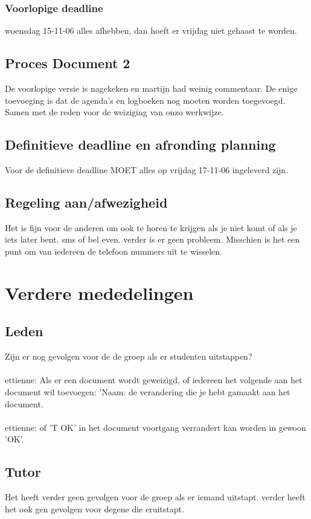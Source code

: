 \documentclass[11pt]{article}
\begin{document}
\subsubsection*{Voorlopige deadline}
woensdag 15-11-06 alles afhebben, dan hoeft er vrijdag niet gehaast
te worden.

\subsection*{Proces Document 2}
De voorlopige versie is nagekeken en martijn had weinig commentaar.
De enige toevoeging is dat de agenda's en logboeken nog moeten
worden toegevoegd. Samen met de reden voor de weiziging van onzo
werkwijze.

\subsection*{Definitieve deadline en afronding planning}
Voor de definitieve deadline MOET alles op vrijdag 17-11-06
ingeleverd zijn.

\subsection*{Regeling aan/afwezigheid}
Het is fijn voor de anderen om ook te horen te krijgen als je niet
komt of als je iets later bent. sms of bel even. verder is er geen
probleem. Misschien is het een punt om van iedereen de telefoon
nummers uit te wisselen.

\section{Verdere mededelingen}

\subsection*{Leden}
Zijn er nog gevolgen voor de de groep als er studenten
uitstappen?\\\\

ettienne: Als er een document wordt geweizigd, of iedereen het
volgende aan het document wil toevoegen: 'Naam: de verandering die
je hebt gamaakt aan het document.\\\\

ettienne: of 'T OK' in het document voortgang verrandert kan worden
in gewoon 'OK'.

\subsection*{Tutor}
Het heeft verder geen gevolgen voor de groep als er iemand uitstapt.
verder heeft het ook gen gevolgen voor degene die eruitstapt.
\end{document}
